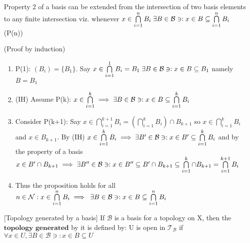 \documentclass[11pt]{amsart}
\begin{document}
\begin{remark}
Property 2 of a basis can be  extended from the  intersection of two basis elements to any finite intersection viz. whenever $x \in \bigcap\limits_{i =1}^n B_i \;  \exists B \in \mathcal{B} \ni : x \in B \subseteq  \bigcap\limits_{i  =1}^n B_i$ (P(n))
\begin{verify} (Proof by induction) 
\begin{enumerate}
\item P(1):  $(B_i) = \{B_1\}$. Say $x \in \bigcap\limits_{i  =1}^1 B_i = B_1\;  \exists B \in \mathcal{B} \ni : x \in B \subseteq B_1$ namely $B=B_1$
\item (IH) Assume P(k): $x \in \bigcap\limits_{i  =1}^k \implies  \exists B \in \mathcal{B} \ni : x \in B \subseteq  \bigcap\limits_{i  =1}^k B_i$
\item Consider P(k+1):  Say $x \in \bigcap\limits_{i  =1}^{k+1} B_i = (\bigcap\limits_{i  =1}^k B_i) \cap B_{k+1}$ so $x \in \bigcap\limits_{i  =1}^k B_i$ and $x \in B_{k+1}$. By (IH) $x \in \bigcap\limits_{i  =1}^k B_i \implies \exists B' \in \mathcal{B} \ni : x \in B' \subseteq \bigcap\limits_{i  =1}^k B_i$ and by the property of a basis  $x \in B' \cap B_{k+1} \implies \exists B'' \in \mathcal{B} \ni : x \in B'' \subseteq B' \cap B_{k+1} \subseteq \bigcap\limits_{i  =1}^k \cap B_{k+1} = \bigcap\limits_{i  =1}^{k+1} B_i$
\item Thus the proposition holds for all $n \in \mathcal{N}: x \in \bigcap\limits_{i =1}^n B_i \implies \;  \exists B \in \mathcal{B} \ni : x \in B \subseteq  \bigcap\limits_{i  =1}^n B_i$
\end{enumerate}
\end{verify}
\end{remark}


\begin{definition}{[Topology generated by a basis]}
If $\mathcal{B}$ is a basis for a topology on X, then the $\textbf{topology generated}$ by it is defined by:
U is open in $\mathcal{T}_{\mathcal{B}}$ if $\forall x \in U, \exists B \in \mathcal{B} \ni: x \in B \subseteq U$
\end{definition}
\end{document}
